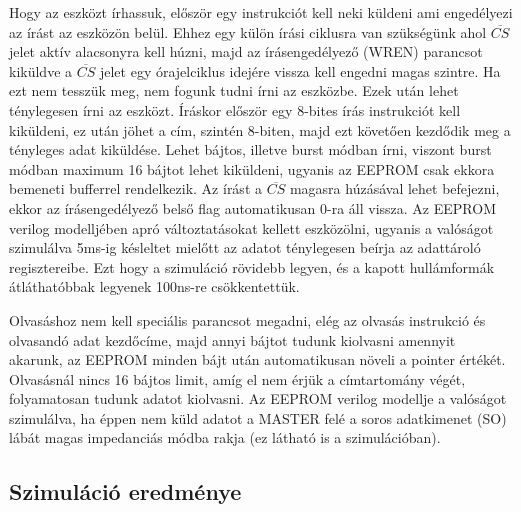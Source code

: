 \documentclass[a4paper,11pt]{article}
\begin{document}
Hogy az eszközt írhassuk, először egy instrukciót kell neki küldeni ami engedélyezi az írást az eszközön belül. Ehhez egy külön írási ciklusra van szükségünk ahol $\overline{CS}$ jelet aktív alacsonyra kell húzni, majd az írásengedélyező (WREN) parancsot kiküldve a $\overline{CS}$ jelet egy órajelciklus idejére vissza kell engedni magas szintre. Ha ezt nem tesszük meg, nem fogunk tudni írni az eszközbe. Ezek után lehet ténylegesen írni az eszközt. Íráskor először egy 8-bites írás instrukciót kell kiküldeni, ez után jöhet a cím, szintén 8-biten, majd ezt követően kezdődik meg a tényleges adat kiküldése. Lehet bájtos, illetve burst módban írni, viszont burst módban maximum 16 bájtot lehet kiküldeni, ugyanis az EEPROM csak ekkora bemeneti bufferrel rendelkezik. Az írást a $\overline{CS}$ magasra húzásával lehet befejezni, ekkor az írásengedélyező belső flag automatikusan 0-ra áll vissza. Az EEPROM verilog modelljében apró változtatásokat kellett eszközölni, ugyanis a valóságot szimulálva 5ms-ig késleltet mielőtt az adatot ténylegesen beírja az adattároló regisztereibe. Ezt hogy a szimuláció rövidebb legyen, és a kapott hullámformák átláthatóbbak legyenek 100ns-re csökkentettük.

Olvasáshoz nem kell speciális parancsot megadni, elég az olvasás instrukció és olvasandó adat kezdőcíme, majd annyi bájtot tudunk kiolvasni amennyit akarunk, az EEPROM minden bájt után automatikusan növeli a pointer értékét. Olvasásnál nincs 16 bájtos limit, amíg el nem érjük a címtartomány végét, folyamatosan tudunk adatot kiolvasni. Az EEPROM verilog modellje a valóságot szimulálva, ha éppen nem küld adatot a MASTER felé a soros adatkimenet (SO) lábát magas impedanciás módba rakja (ez látható is a szimulációban).

\subsection{Szimuláció eredménye}
\end{document}
